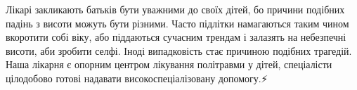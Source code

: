 Лікарі закликають батьків бути уважними до своїх дітей, бо причини подібних
падінь з висоти можуть бути різними. Часто підлітки намагаються таким чином
вкоротити собі віку, або піддаються сучасним трендам і залазять на небезпечні
висоти, аби зробити селфі. Іноді випадковість стає причиною подібних трагедій.
Наша лікарня є опорним центром лікування політравми у дітей, спеціалісти
цілодобово готові надавати високоспеціалізовану допомогу.⚡️
